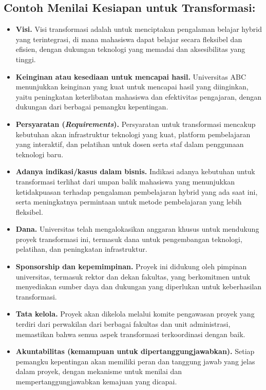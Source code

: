 \subsection*{Contoh Menilai Kesiapan untuk Transformasi:}
\begin{itemize}
	\item \textbf{Visi.} Visi transformasi adalah untuk menciptakan pengalaman belajar hybrid yang terintegrasi, di mana mahasiswa dapat belajar secara fleksibel dan efisien, dengan dukungan teknologi yang memadai dan aksesibilitas yang tinggi.
	
	\item \textbf{Keinginan atau kesediaan untuk mencapai hasil.} Universitas ABC menunjukkan keinginan yang kuat untuk mencapai hasil yang diinginkan, yaitu peningkatan keterlibatan mahasiswa dan efektivitas pengajaran, dengan dukungan dari berbagai pemangku kepentingan.
	
	\item \textbf{Persyaratan (\textit{Requirements}).} Persyaratan untuk transformasi mencakup kebutuhan akan infrastruktur teknologi yang kuat, platform pembelajaran yang interaktif, dan pelatihan untuk dosen serta staf dalam penggunaan teknologi baru.
	
	\item \textbf{Adanya indikasi/kasus dalam bisnis.} Indikasi adanya kebutuhan untuk transformasi terlihat dari umpan balik mahasiswa yang menunjukkan ketidakpuasan terhadap pengalaman pembelajaran hybrid yang ada saat ini, serta meningkatnya permintaan untuk metode pembelajaran yang lebih fleksibel.
	
	\item \textbf{Dana.} Universitas telah mengalokasikan anggaran khusus untuk mendukung proyek transformasi ini, termasuk dana untuk pengembangan teknologi, pelatihan, dan peningkatan infrastruktur.
	
	\item \textbf{Sponsorship dan kepemimpinan.} Proyek ini didukung oleh pimpinan universitas, termasuk rektor dan dekan fakultas, yang berkomitmen untuk menyediakan sumber daya dan dukungan yang diperlukan untuk keberhasilan transformasi.
	
	\item \textbf{Tata kelola.} Proyek akan dikelola melalui komite pengawasan proyek yang terdiri dari perwakilan dari berbagai fakultas dan unit administrasi, memastikan bahwa semua aspek transformasi terkoordinasi dengan baik.
	
	\item \textbf{Akuntabilitas (kemampuan untuk dipertanggungjawabkan).} Setiap pemangku kepentingan akan memiliki peran dan tanggung jawab yang jelas dalam proyek, dengan mekanisme untuk menilai dan mempertanggungjawabkan kemajuan yang dicapai.
	

\end{itemize}
